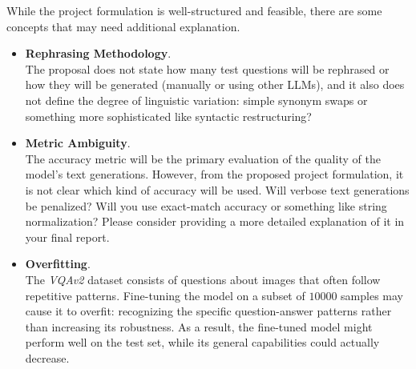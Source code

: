 While the project formulation is well-structured and feasible, there are some concepts 
that may need additional explanation.
\begin{itemize}
    \renewcommand{\labelitemi}{-}
    \item \textbf{Rephrasing Methodology}. \\ 
    The proposal does not state how many test questions will be rephrased or how they
    will be generated (manually or using other LLMs), and it also does not define the
    degree of linguistic variation: simple synonym swaps or something more
    sophisticated like syntactic restructuring?
    \item \textbf{Metric Ambiguity}. \\ 
    The accuracy metric will be the primary evaluation of the quality of the model's 
    text generations. However, from the proposed project formulation, it is not clear 
    which kind of accuracy will be used. Will verbose text generations be penalized? 
    Will you use exact-match accuracy or something like string normalization? 
    Please consider providing a more detailed explanation of it in your final report.
    \item \textbf{Overfitting}. \\ 
    The \textit{VQAv2} dataset consists of questions about images that often follow repetitive 
    patterns. Fine-tuning the model on a subset of $10000$ samples may cause it to 
    overfit: recognizing the specific question-answer patterns rather than increasing 
    its robustness. As a result, the fine-tuned model might perform well on the test 
    set, while its general capabilities could actually decrease.
\end{itemize}